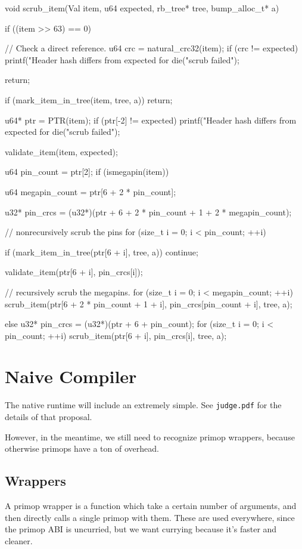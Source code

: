 \begin{clang}
void scrub_item(Val item, u64 expected, rb_tree* tree, bump_alloc_t* a) {
  if ((item >> 63) == 0) {
    // Check a direct reference.
    u64 crc = natural_crc32(item);
    if (crc != expected) {
      printf("Header hash differs from expected for %
      die("scrub failed");
    }

    return;
  }

  if (mark_item_in_tree(item, tree, a)) {
    return;
  }

  u64* ptr = PTR(item);
  if (ptr[-2] != expected) {
    printf("Header hash differs from expected for %
    die("scrub failed");
  }

  validate_item(item, expected);

  u64 pin_count = ptr[2];
  if (ismegapin(item)) {
    u64 megapin_count = ptr[6 + 2 * pin_count];

    u32* pin_crcs = (u32*)(ptr + 6 + 2 * pin_count + 1 + 2 * megapin_count);

    // nonrecursively scrub the pins
    for (size_t i = 0; i < pin_count; ++i) {
      if (mark_item_in_tree(ptr[6 + i], tree, a))
        continue;

      validate_item(ptr[6 + i], pin_crcs[i]);
    }

    // recursively scrub the megapins.
    for (size_t i = 0; i < megapin_count; ++i) {
      scrub_item(ptr[6 + 2 * pin_count + 1 + i],
                 pin_crcs[pin_count + i],
                 tree, a);
    }
  } else {
    u32* pin_crcs = (u32*)(ptr + 6 + pin_count);
    for (size_t i = 0; i < pin_count; ++i) {
      scrub_item(ptr[6 + i], pin_crcs[i], tree, a);
    }
  }
}
\end{clang}

\section{Naive Compiler}

The native runtime will include an extremely simple.  See
\lstinline|judge.pdf| for the details of that proposal.

However, in the meantime, we still need to recognize primop wrappers,
because otherwise primops have a ton of overhead.

\subsection{Wrappers}

A primop wrapper is a function which take a certain number of arguments,
and then directly calls a single primop with them.  These are used
everywhere, since the primop ABI is uncurried, but we want currying
because it's faster and cleaner.

